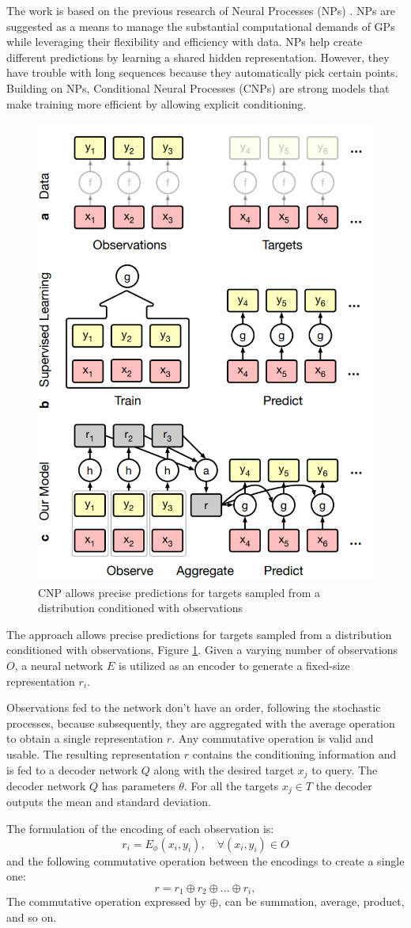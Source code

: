The work is based on the previous research of Neural Processes (NPs) \cite{garnelo2018neural}. NPs are suggested as a means to manage the substantial computational demands of GPs while leveraging their flexibility and efficiency with data. NPs help create different predictions by learning a shared hidden representation.
However, they have trouble with long sequences because they automatically pick certain points. Building on NPs, Conditional Neural Processes (CNPs) are strong models that make training more efficient by allowing explicit conditioning.
\begin{figure}
	\centering
	\includegraphics[width=0.4\linewidth]{Images/CNPdata.png}
	\caption{CNP allows precise predictions for targets sampled from a distribution conditioned with observations}
	\label{fig:cnp_data}
\end{figure}
The approach allows precise predictions for targets sampled from a distribution conditioned with observations, Figure \ref{fig:cnp_data}. Given a varying number of observations $O$, a neural network $E$ is utilized as an encoder to generate a fixed-size representation $r_i$.

Observations fed to the network don't have an order, following the stochastic processes, because subsequently, they are aggregated with the average operation to obtain a single representation $r$. Any commutative operation is valid and usable. The resulting representation $r$ contains the conditioning information and is fed to a decoder network $Q$ along with the desired target $x_j$ to query. The decoder network $Q$ has parameters $\theta$. For all the targets $x_j \in T$ the decoder outputs the mean and standard deviation.

The formulation of the encoding of each observation is:
\begin{equation}
r_i = E_\phi(x_i,y_i), \quad \forall(x_i,y_i) \in O
\end{equation}
and the following commutative operation between the encodings to create a single one: 
\begin{equation} \label{eq:commutative-operation}
    r = r_1 \oplus r_2 \oplus ... \oplus r_i,
\end{equation}
The commutative operation expressed by $\oplus$, can be summation, average, product, and so on. 

